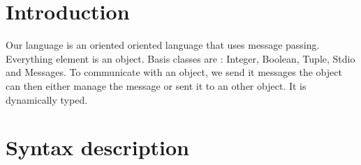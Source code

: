 \documentclass{eplDoc}
\begin{document}
\maketitle
\newpage

\section{Introduction}
Our language is an oriented oriented language that uses message passing.  
Everything element is an object.  Basis classes are : Integer, Boolean, Tuple, 
Stdio and Messages.  To communicate with an object, we send it messages the 
object can then either manage the message or sent it to an other object.
It is dynamically typed. %
\section{Syntax description}
\end{document}
